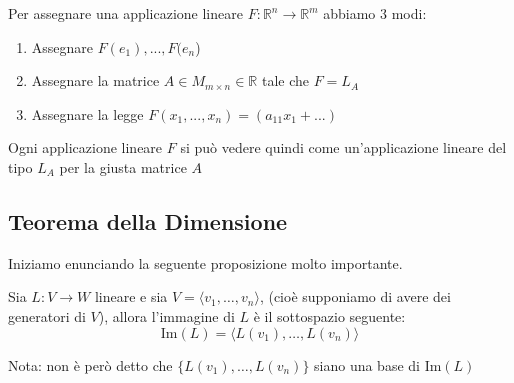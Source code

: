 \documentclass[
  a4paper,
]{article}
\providecommand{\tightlist}{%
  \setlength{\itemsep}{0pt}\setlength{\parskip}{0pt}}
\providecommand{\tightlist}{}
\begin{document}
\begin{observationbox}
Per assegnare una applicazione lineare
\(F: \mathbb{R}^n \to \mathbb{R}^m\) abbiamo 3 modi:

\begin{enumerate}
\def\labelenumi{\arabic{enumi}.}
\tightlist
\item
  Assegnare \(F(e_1), ..., F(e_n\))
\item
  Assegnare la matrice \(A \in M_{m \times n} \in \mathbb{R}\) tale che
  \(F = L_A\)
\item
  Assegnare la legge \(F(x_1, ... , x_n) = (a_{11}x_1 + ...)\)
\end{enumerate}
\end{observationbox}

\begin{notebox}
Ogni applicazione lineare \(F\) si può vedere quindi come
un'applicazione lineare del tipo \(L_A\) per la giusta matrice \(A\)
\end{notebox}

\hypertarget{teorema-della-dimensione}{%
\subsection{Teorema della Dimensione}\label{teorema-della-dimensione}}

Iniziamo enunciando la seguente proposizione molto importante.

\begin{propositionbox}
Sia \(L: V \to W\) lineare e sia
\(V = \langle v_1, \dots, v_n \rangle\), (cioè supponiamo di avere dei
generatori di \(V\)), allora l'immagine di \(L\) è il sottospazio
seguente: \[
\text{Im}(L) = \langle L(v_1), \dots , L(v_n) \rangle
\]
\end{propositionbox}

\begin{notebox}
Nota: non è però detto che \(\{L(v_1), \dots , L(v_n)\}\) siano una base
di \(\text{Im}(L)\)
\end{notebox}
\end{document}
